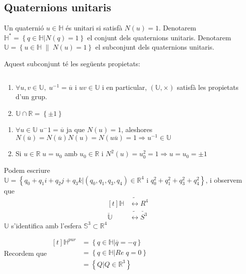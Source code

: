 \documentclass[a4paper,12pt]{article}
\begin{document}
	\subsection{Quaternions unitaris}
	\begin{definicio}
		Un quaternió $u \in \mathbb{H}$ és unitari si satisfà $N(u) = 1$. Denotarem $\mathbb{H}^* = \left\{q \in \mathbb{H} | N(q) = 1\right\}$ el conjunt dels quaternions unitaris.
		Denotarem $\mathbb{U} = \left\{u \in \mathbb{H}\;\|\;N(u) = 1\right\}$ el subconjunt dels quaternions unitaris.
	\end{definicio}
	Aquest subconjunt té les següents propietats:
	\begin{proposicio} $\;$
		\begin{enumerate}
			\item $\forall u, v \in \mathbb{U},\;u^{-1} = \overline{u}$ i $uv \in \mathbb{U}$ i en particular,
			$(\mathbb{U}, \times)$ satisfà les propietats d'un grup.
			\item $\mathbb{U} \cap \mathbb{R} = \left\{\pm 1\right\}$
		\end{enumerate}
	\end{proposicio}
	\begin{demostracio}
		\begin{enumerate}
			\item $\forall u \in \mathbb{U}\; u^-1 = \overline{u}$ ja que $N(u) = 1$, aleshores $N(\overline{u}) = N(\overline{u})N(u) = N(u\overline{u}) = 1 \Rightarrow u^{-1}\in \mathbb{U}$
			\item Si $u \in \mathbb{R}\;u = u_0$ amb $u_0 \in \mathbb{R}$ i $N^2(u) = u_0^2 = 1 \Rightarrow u = u_0 = \pm 1$
		\end{enumerate}
	\end{demostracio}
	\begin{obs}
		Podem escriure $\mathbb{U} = \left\{q_0+q_1i+q_2j+q_3k | (q_0, q_1, q_3, q_4) \in \mathbb{R}^4\text{ i } q_0^2 + q_1^2 + q_3^2 + q_4^2 \right\}$,
		i observem que
		\begin{displaymath}
			\begin{aligned}[t]
				\mathbb{H} &\tilde{\longleftrightarrow} R^4\\
				\breve{\mathbb{U}} &\tilde{\longleftrightarrow} \breve{S^3}
			\end{aligned}
		\end{displaymath}
		$\mathbb{U}$ s'identifica amb l'esfera $\mathbb{S}^3 \subset \mathbb{R}^4$
	\end{obs}
	Recordem que $\begin{aligned}[t]
					\mathbb{H}^{pur} &= \left\{q \in \mathbb{H} | \overline{q} = -q\right\}\\
									 &= \left\{q \in \mathbb{H} | Re\;q = 0\right\}\\
									 &= \left\{Q | Q \in \mathbb{R}^3\right\}
				  \end{aligned}$
\end{document}
